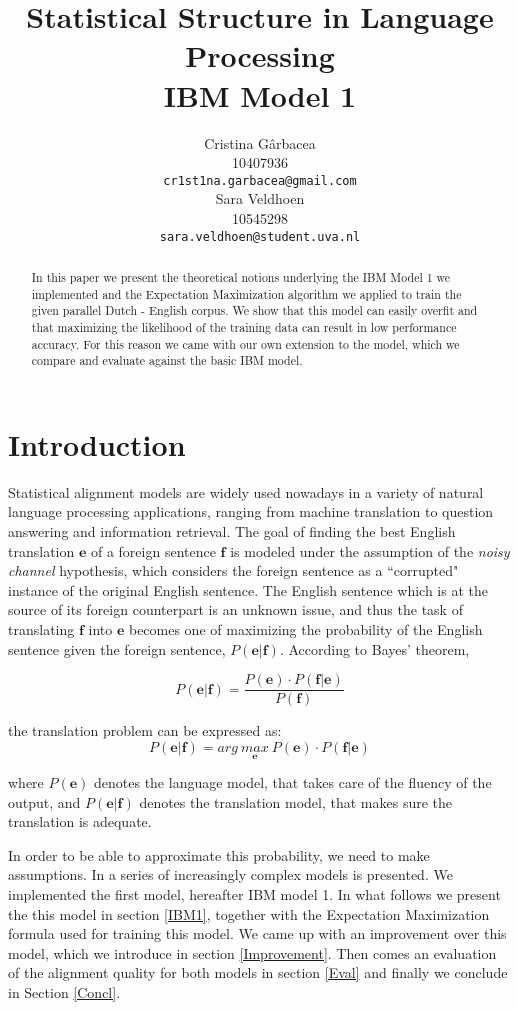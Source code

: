 \documentclass[11pt]{article}
\title{Statistical Structure in Language Processing \\ IBM Model 1}
\author{ Cristina G\^arbacea\\
  10407936 \\
  {\small \tt cr1st1na.garbacea@gmail.com} 
  \\\And
  Sara Veldhoen \\
10545298   \\
  {\small \tt sara.veldhoen@student.uva.nl} \\}
\date{}
\renewcommand{\vec}[1]{\mathbf{#1}}
\begin{document}
\maketitle

\begin{abstract}
In this paper we present the theoretical notions underlying the IBM Model 1 we implemented and the Expectation Maximization algorithm we applied to train the given parallel Dutch - English corpus. We show that this model can easily overfit and that maximizing the likelihood of the training data can result in low performance accuracy.%
 For this reason we came with our own extension to the model, which we compare and evaluate against the basic IBM model. 
\end{abstract}

\section{Introduction}
Statistical alignment models are widely used nowadays in a variety of natural language processing applications, ranging from machine translation to question answering and information retrieval. The goal of finding the best English translation $\vec{e}$ of a foreign sentence $\vec{f}$ is modeled under the assumption of the \textit{noisy channel} hypothesis, which considers the foreign sentence as a ``corrupted" instance of the original English sentence. The English sentence which is at the source of its foreign counterpart is an unknown issue, and thus the task of translating $\vec{f}$ into $\vec{e}$ becomes one of maximizing the probability of the English sentence given the foreign sentence, $P(\vec{e}|\vec{f})$. According to Bayes' theorem, 

\begin{equation}
P(\vec{e}|\vec{f})= \frac{P(\vec{e})\cdot P(\vec{f}|\vec{e})}{P(\vec{f})}
\end{equation}

the translation problem can be expressed as:
\begin{equation}
P(\vec{e}|\vec{f})= arg \ \underset{\vec{e}}{max} \ P(\vec{e})\cdot P(\vec{f}|\vec{e})
\end{equation}

where $P(\vec{e})$ denotes the language model, that takes care of the fluency of the output, 
 and $P(\vec{e}|\vec{f})$ denotes the translation model, that makes sure the translation is adequate. 

In order to be able to approximate this probability, we need to make assumptions. In %
a series of increasingly complex models is presented. We implemented the first model, hereafter IBM model 1. 
In what follows we present the this model in section \ref{IBM1}, together with the Expectation Maximization formula used for training this model. We came up with an improvement over this model, which we introduce in section \ref{Improvement}. Then comes an evaluation of the alignment quality for both models in section \ref{Eval} and finally we conclude in Section \ref{Concl}.
\end{document}
